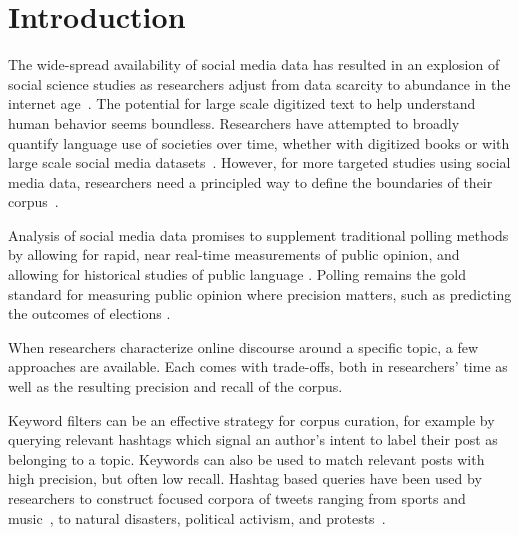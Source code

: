 

\section{Introduction}
\label{sec:corpusCreation.introduction}




The wide-spread availability of social media data
has resulted in an explosion of social science studies
as researchers adjust
from data scarcity
to abundance
in the internet age~\cite{lazer2009computational,lazer2021meaningful}.
The potential for large scale digitized text to
help understand human behavior seems boundless.
Researchers have attempted to broadly quantify language use of societies over time, 
whether with digitized books
or with large scale social media datasets~\cite{michel2011quantitative,alshaabi2021storywrangler}.
However, for more targeted studies using social media data, researchers need a principled way to define the boundaries of their corpus~\cite{shugars2021pandemics}.

Analysis of social media data promises to supplement
traditional polling methods
by allowing for
rapid, near real-time measurements
of public opinion,
and allowing for historical studies of public language \cite{oconnor2010, cody2015climate, cody2016, wu2023}.
Polling remains the gold standard
for measuring public opinion where precision matters,
such as predicting the outcomes of elections 
.

When researchers characterize online discourse around a specific topic, a few approaches are available.
Each comes with trade-offs, both in researchers' time as well as the resulting precision and recall of the corpus.

Keyword filters can be an effective strategy for corpus curation, for example by querying relevant hashtags 
which signal an author's intent to label their post as belonging to a topic.
Keywords can also be used to match relevant posts with high precision, but often low recall.
Hashtag based queries have been used by researchers
to construct focused corpora of tweets ranging from sports and music~\cite{blaszka2012worldseries,choi2014south},
to natural disasters, political activism, and
protests~\cite{steinert2015online,lotan2011arab,freelon2016beyond,jackson2020hashtagactivism,gallagher2019reclaiming,gallagher2018divergent,gorodnichenko2021social,arnold2021hurricanes}.

